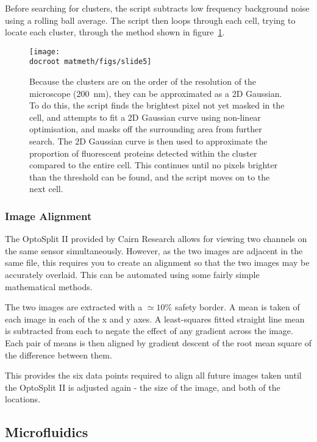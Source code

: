 \documentclass[../main.tex]{subfiles}
\begin{document}
Before searching for clusters, the script subtracts low frequency background noise using a rolling ball average. The script then loops through each cell, trying to locate each cluster, through the method shown in figure~\ref{fig:imageprocessing:clusterdetection}.

\begin{figure}[h!]
\begin{center}
\texttt{[image: \\docroot matmeth/figs/slide5]}
\caption{Because the clusters are on the order of the resolution of the microscope (\SI{200}{\nano\meter}), they can be approximated as a 2D Gaussian. To do this, the script finds the brightest pixel not yet masked in the cell, and attempts to fit a 2D Gaussian curve using non-linear optimisation, and masks off the surrounding area from further search. The 2D Gaussian curve is then used to approximate the proportion of fluorescent proteins detected within the cluster compared to the entire cell. This continues until no pixels brighter than the threshold can be found, and the script moves on to the next cell.}
\label{fig:imageprocessing:clusterdetection}
\end{center}
\end{figure}



\subsubsection{Image Alignment}

The OptoSplit II provided by Cairn Research allows for viewing two channels on the same sensor simultaneously. However, as the two images are adjacent in the same file, this requires you to create an alignment so that the two images may be accurately overlaid. This can be automated using some fairly simple mathematical methods.

The two images are extracted with a \(\simeq10\%\) safety border. A mean is taken of each image in each of the x and y axes. A least-squares fitted straight line mean is subtracted from each to negate the effect of any gradient across the image. Each pair of means is then aligned by gradient descent of the root mean square of the difference between them.

This provides the six data points required to align all future images taken until the OptoSplit II is adjusted again - the size of the image, and both of the locations.

\subsection{Microfluidics}
\end{document}
